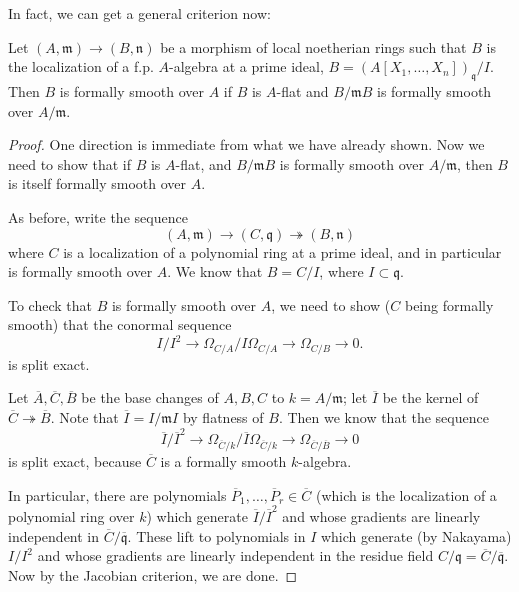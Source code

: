 In fact, we can get a general criterion now:

\begin{theorem} 
Let $(A, \mathfrak{m}) \to (B, \mathfrak{n})$ be a morphism of local
noetherian rings such that $B$ is the localization of a f.p. $A$-algebra at a prime
ideal, $B = (A[X_1, \dots, X_n])_{\mathfrak{q}}/I$. Then $B$ is formally
smooth over $A$ if $B$ is $A$-flat and $B/\mathfrak{m}B$ is formally smooth
over $A/\mathfrak{m}$.
\end{theorem} 

\begin{proof} 
One direction is immediate from what we have already shown. Now we need to
show that if $B$ is $A$-flat, and $B/\mathfrak{m}B$ is formally smooth over
$A/\mathfrak{m}$, then $B$ is itself formally smooth over $A$.

As before, write the sequence
\[ (A, \mathfrak{m}) \to (C, \mathfrak{q}) \twoheadrightarrow (B,\mathfrak{n})
\]
where $C$ is a localization of a polynomial ring at a prime ideal, and in
particular is formally smooth over $A$. 
We know that $B = C/I$, where $I \subset \mathfrak{q}$.

To check that $B$ is formally smooth over $A$, we need to show ($C$ being
formally smooth) that the conormal sequence
\[ I/I^2 \to  \Omega_{C/A} / I \Omega_{C/A} \to \Omega_{C/B} \to 0. \]
is split exact. 

Let $\overline{A}, \overline{C}, \overline{B}$ be the base changes of $A, B,
C$ to $k = A/\mathfrak{m}$; let $\overline{I}$ be the kernel of $\overline{C}
\twoheadrightarrow \overline{B}$.
Note that $\overline{I} = I/\mathfrak{m}I$ by flatness of $B$.
Then we know that the sequence
\[ \overline{I}/\overline{I}^2 \to  \Omega_{\overline{C}/k} / \overline{I}
\Omega_{\overline{C}/k} \to \Omega_{\overline{C}/\overline{B}} \to 0\]
is split exact, because $\overline{C}$ is a formally smooth $k$-algebra.

In particular, there are polynomials $\overline{P}_1, \dots, \overline{P}_r
\in \overline{C}$ (which is the localization of a polynomial ring over $k$)
which generate $\overline{I}/\overline{I}^2$ and
whose gradients are linearly independent in
$\overline{C}/\mathfrak{\overline{q}}$. These lift to polynomials in $I$
which generate (by Nakayama) $I/I^2$ and whose gradients are linearly
independent in the residue field $C/\mathfrak{q} =
\overline{C}/\overline{\mathfrak{q}}$.
Now by the Jacobian criterion, we are done.
\end{proof} 


